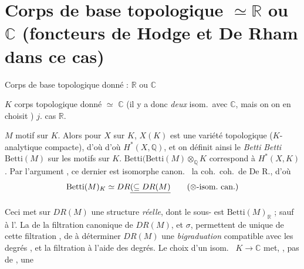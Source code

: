 \documentclass[11pt,a4paper]{article}
\begin{document}
\section{Corps de base topologique $\simeq \mathbb{R}$ ou $\mathbb{C}$ (foncteurs de Hodge et De Rham dans ce cas)}



 Corps de base topologique donné : $\mathbb{R}$ ou $\mathbb{C}$

$K$ corps topologique donné $\simeq$ \ill{} $\mathbb{C}$ (il y a donc
\emph{deux} isom.\ avec $\mathbb{C}$, mais on \ill{} on en choisit
) $j$. \ill{} cas $\mathbb{R}$.

$M$ motif sur $K$. Alors    
pour \ill{} $X$  sur $K$, $X(K)$ est une \ill{}
variété topologique \ill{} ($K$-analytique compacte), d'où d'où
$H^{*}(X, \mathbb{Q})$, et on définit ainsi  le
\emph{Betti} \emph{Betti} $\mathrm{Betti}(M)$ sur les motifs sur $K$.
$\mathrm{Betti}(\mathrm{Betti}(M) \otimes_{\mathbb{Q}} K$ \struck{$\simeq$}
correspond à $H^{*}(X, K)$. Par l'argument  ,
ce dernier est isomorphe canon.\ \ill{} la coh.\ coh.\ de De R., d'où
\[
  \mathrm{Betti}(M)_{K} \simeq DR\struck{(\subseteq DR(M)} \qquad \text{($\otimes$-isom.\ can.)}
\]

Ceci met sur  $DR(M)$  une structure
\emph{réelle}, dont le sous-\ill{}   est
$\mathrm{Betti}(M)_{\mathbb{R}}$ ; sauf à l'. La
 de la filtration canonique de $DR(M)$, et $\sigma$,
permettent \struck{\ill{}} de  unique de 
cette filtration , de  à
déterminer \ill{} $DR(M)$ une  \emph{bigraduation} compatible avec
les degrés , et \ill{}  la filtration
\ill{} à l'aide des  degrés. Le choix d'un isom.\
 $K \to \mathbb{C}$ met, , pas
\uncertain{beaucoup} de \ill{}, une
\end{document}
